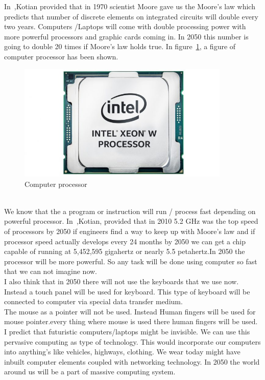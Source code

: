  In~\cite{c.realme.comWebsite},Kotian provided that in 1970 scientist Moore gave us the Moore's law which predicts that number of discrete elements on integrated circuits will double every two years. Computers /Laptops will come with double processing power with more powerful processors and graphic cards coming in. In 2050 this number is going to double 20 times if Moore's law holds true. In figure~\ref{fig:fig7}, a figure of computer processor has been shown. \\
 \begin{figure}[h]
    \centering
    \includegraphics[width = 0.9\textwidth]{pic/process.jpg}
    \caption{Computer processor}
    \label{fig:fig7}
\end{figure}\\
We know that the a program or instruction will run / process fast depending on powerful processor. In~\cite{c.realme.comWebsite},Kotian, provided that in 2010 5.2 GHz was the top speed of processors by 2050 if engineers find a way to keep up with Moore's law and if processor speed actually develops every 24 months by 2050 we can get a chip capable of running at 5,452,595 gigahertz or nearly 5.5 petahertz.In 2050 the processor will be more powerful. So any task will be done using computer so fast that we can not imagine now.\\
I also think that in 2050 there will not use the keyboards that we use now. Instead a touch panel will be used for keyboard. This type of keyboard will be connected to computer via special data transfer medium.\\
The mouse as a pointer will not be used. Instead Human fingers will be used for mouse pointer.every thing where mouse is used there human fingers will be used.\\
I predict that futuristic computers/laptops might be invisible. We can use this pervasive computing as type of technology. This would incorporate our computers into anything's like vehicles, highways, clothing.  We wear today might have inbuilt computer elements coupled with networking technology. In 2050 the world around us will be a part of massive computing system.\\
